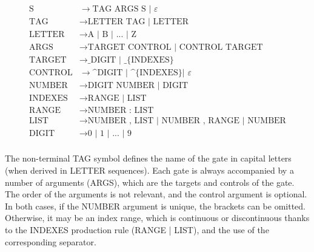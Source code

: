 \documentclass[sigconf,natbib=false]{acmart}
\begin{document}
\begin{align*}
\text{S} &\rightarrow \text{TAG ARGS S | } \varepsilon \\
\text{TAG} &\rightarrow \text{LETTER TAG | LETTER} \\
\text{LETTER} &\rightarrow \text{A | B | ... | Z} \\
\text{ARGS} &\rightarrow \text{TARGET CONTROL | CONTROL TARGET} \\
\text{TARGET} &\rightarrow \text{\_DIGIT | \_\{INDEXES\}} \\
\text{CONTROL} &\rightarrow \text{\textasciicircum DIGIT | \textasciicircum \{INDEXES\} | } \varepsilon \\
\text{NUMBER} &\rightarrow \text{DIGIT NUMBER | DIGIT} \\
\text{INDEXES} &\rightarrow \text{RANGE | LIST} \\
\text{RANGE} &\rightarrow \text{NUMBER : LIST} \\
\text{LIST} &\rightarrow \text{NUMBER , LIST | NUMBER , RANGE | NUMBER} \\
\text{DIGIT} &\rightarrow \text{0 | 1 | ... | 9} \\
\end{align*}

The non-terminal TAG symbol defines the name of the gate in capital letters (when derived in LETTER sequences). Each gate is always accompanied by a number of arguments (ARGS), which are the targets and controls of the gate. The order of the arguments is not relevant, and the control argument is optional. In both cases, if the NUMBER argument is unique, the brackets can be omitted. Otherwise, it may be an index range, which is continuous or discontinuous thanks to the INDEXES production rule (RANGE | LIST), and the use of the corresponding separator.
\end{document}
